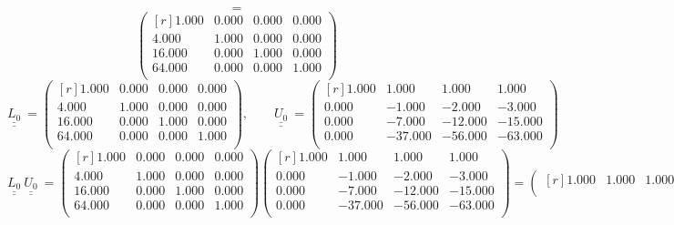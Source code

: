 \documentclass{report}[10pts]
\begin{document}
\begin{enumerate}[- Ex. 1]
\begin{itemize}
\[   =
\]
\[
      \begin{pmatrix*}[r]
         1.000 & 0.000 & 0.000 & 0.000\\
         4.000 & 1.000 & 0.000 & 0.000\\
         16.000 & 0.000 & 1.000 & 0.000\\
         64.000 & 0.000 & 0.000 & 1.000\\
      \end{pmatrix*}
\]
\[
   \underline{\underline{L_{0}}}~
   =
      \begin{pmatrix*}[r]
         1.000 & 0.000 & 0.000 & 0.000\\
         4.000 & 1.000 & 0.000 & 0.000\\
         16.000 & 0.000 & 1.000 & 0.000\\
         64.000 & 0.000 & 0.000 & 1.000\\
      \end{pmatrix*}
   ,\qquad
   \underline{\underline{U_{0}}}~
   =
      \begin{pmatrix*}[r]
         1.000 & 1.000 & 1.000 & 1.000\\
         0.000 & -1.000 & -2.000 & -3.000\\
         0.000 & -7.000 & -12.000 & -15.000\\
         0.000 & -37.000 & -56.000 & -63.000\\
      \end{pmatrix*}
\]
\[
   \underline{\underline{L_{0}}}~
   \underline{\underline{U_{0}}}~
   =
      \begin{pmatrix*}[r]
         1.000 & 0.000 & 0.000 & 0.000\\
         4.000 & 1.000 & 0.000 & 0.000\\
         16.000 & 0.000 & 1.000 & 0.000\\
         64.000 & 0.000 & 0.000 & 1.000\\
      \end{pmatrix*}
      \begin{pmatrix*}[r]
         1.000 & 1.000 & 1.000 & 1.000\\
         0.000 & -1.000 & -2.000 & -3.000\\
         0.000 & -7.000 & -12.000 & -15.000\\
         0.000 & -37.000 & -56.000 & -63.000\\
      \end{pmatrix*}
   =
      \begin{pmatrix*}[r]
         1.000 & 1.000 & 1.000 & 1.000\\

\end{pmatrix*}\]
\end{itemize}
\end{enumerate}
\end{document}

